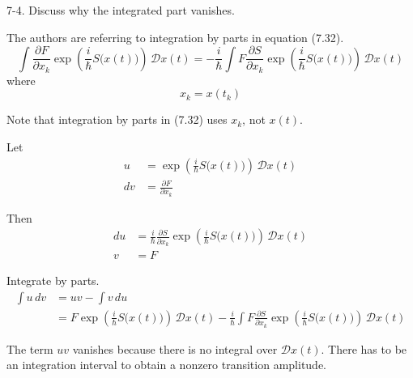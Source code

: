 \documentclass[12pt]{article}
\begin{document}
7-4.
Discuss why the integrated part vanishes.

\bigskip
The authors are referring to integration by parts in equation (7.32).
\begin{equation*}
\int\frac{\partial F}{\partial x_k}
\exp\left(\frac{i}{\hbar}S\big(x(t)\big)\right)\,\mathcal Dx(t)
=
-\frac{i}{\hbar}\int F\frac{\partial S}{\partial x_k}
\exp\left(\frac{i}{\hbar}S\big(x(t)\big)\right)\,\mathcal Dx(t)
\tag{7.32}
\end{equation*}
where
\begin{equation*}
x_k=x(t_k)
\end{equation*}

Note that integration by parts in (7.32) uses $x_k$, not $x(t)$.

\bigskip
Let
\begin{align*}
u&=\exp\left(\frac{i}{\hbar}S\big(x(t)\big)\right)\,\mathcal Dx(t)
\\
dv&=\frac{\partial F}{\partial x_k}
\end{align*}

Then
\begin{align*}
du&=\frac{i}{\hbar}
\frac{\partial S}{\partial x_k}
\exp\left(\frac{i}{\hbar}S\big(x(t)\big)\right)
\,\mathcal Dx(t)
\\
v&=F
\end{align*}

Integrate by parts.
\begin{align*}
\int u\,dv&=uv-\int v\,du
\\
&=F\exp\left(\frac{i}{\hbar}S\big(x(t)\big)\right)\,\mathcal Dx(t)
-\frac{i}{\hbar}\int F
\frac{\partial S}{\partial x_k}
\exp\left(\frac{i}{\hbar}S\big(x(t)\big)\right)
\,\mathcal Dx(t)
\end{align*}

The term $uv$ vanishes because there is no integral over $\mathcal Dx(t)$.
There has to be an integration interval to obtain a nonzero transition amplitude.
\end{document}
